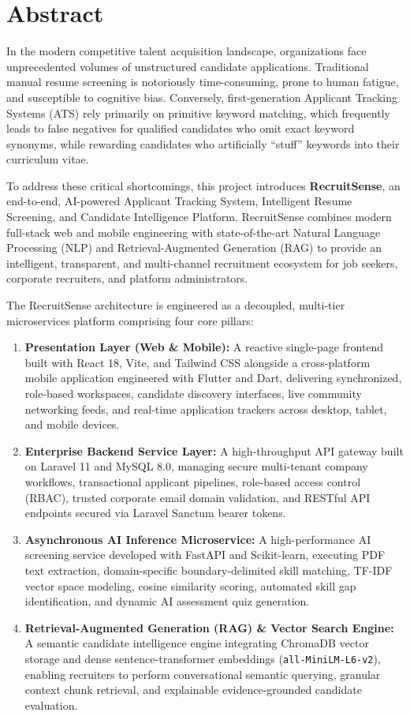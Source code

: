 \chapter*{Abstract}

In the modern competitive talent acquisition landscape, organizations face unprecedented volumes of unstructured candidate applications. Traditional manual resume screening is notoriously time-consuming, prone to human fatigue, and susceptible to cognitive bias. Conversely, first-generation Applicant Tracking Systems (ATS) rely primarily on primitive keyword matching, which frequently leads to false negatives for qualified candidates who omit exact keyword synonyms, while rewarding candidates who artificially ``stuff'' keywords into their curriculum vitae.

To address these critical shortcomings, this project introduces \textbf{RecruitSense}, an end-to-end, AI-powered Applicant Tracking System, Intelligent Resume Screening, and Candidate Intelligence Platform. RecruitSense combines modern full-stack web and mobile engineering with state-of-the-art Natural Language Processing (NLP) and Retrieval-Augmented Generation (RAG) to provide an intelligent, transparent, and multi-channel recruitment ecosystem for job seekers, corporate recruiters, and platform administrators.

The RecruitSense architecture is engineered as a decoupled, multi-tier microservices platform comprising four core pillars:
\begin{enumerate}
    \item \textbf{Presentation Layer (Web \& Mobile):} A reactive single-page frontend built with React 18, Vite, and Tailwind CSS alongside a cross-platform mobile application engineered with Flutter and Dart, delivering synchronized, role-based workspaces, candidate discovery interfaces, live community networking feeds, and real-time application trackers across desktop, tablet, and mobile devices.
    \item \textbf{Enterprise Backend Service Layer:} A high-throughput API gateway built on Laravel 11 and MySQL 8.0, managing secure multi-tenant company workflows, transactional applicant pipelines, role-based access control (RBAC), trusted corporate email domain validation, and RESTful API endpoints secured via Laravel Sanctum bearer tokens.
    \item \textbf{Asynchronous AI Inference Microservice:} A high-performance AI screening service developed with FastAPI and Scikit-learn, executing PDF text extraction, domain-specific boundary-delimited skill matching, TF-IDF vector space modeling, cosine similarity scoring, automated skill gap identification, and dynamic AI assessment quiz generation.
    \item \textbf{Retrieval-Augmented Generation (RAG) \& Vector Search Engine:} A semantic candidate intelligence engine integrating ChromaDB vector storage and dense sentence-transformer embeddings (\texttt{all-MiniLM-L6-v2}), enabling recruiters to perform conversational semantic querying, granular context chunk retrieval, and explainable evidence-grounded candidate evaluation.
\end{enumerate}

